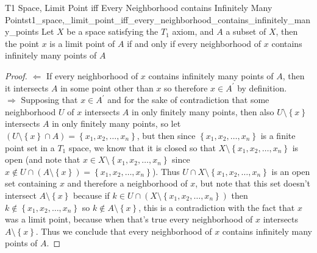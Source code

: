 \begin{proposition}{T1 Space, Limit Point iff Every Neighborhood contains
Infinitely Many
Points}{t1_space,_limit_point_iff_every_neighborhood_contains_infinitely_many_points}
Let \( X \) be a space satisfying the \( T _{ 1 }  \) axiom, and \( A \) a
subset of \( X \), then the point \( x \) is a limit point of \( A \) if and
only if every neighborhood of \( x \) contains infinitely many points of \( A \) 
\end{proposition}
\begin{proof}
    \( \Leftarrow  \) If every neighborhood of \( x \) contains infinitely many
    points of \( A \), then it intersects \( A \) in some point other than \( x
    \) so therefore \( x \in A ^{ \prime  } \) by definition.\\
    \( \Rightarrow  \) Supposing that \( x \in A ^{ \prime  }  \) and for the
    sake of contradiction that some neighborhood \( U \) of \( x \) intersects
    \( A \) in only finitely many points, then also \( U \setminus \left\{ x
    \right\}  \) intersects \( A \) in only finitely many points, so let \(
    \left( U \setminus \left\{ x \right\} \cap A \right) = \left\{ x_{1} , x_{2}
    , \dotsc , x_{n} \right\}  \), but then since  \( \left\{ x_{1} , x_{2}
    , \dotsc , x_{n} \right\} \) is a finite point set in a \( T _{ 1 }  \)
    space, we know that it is closed so that \( X \setminus \left\{ x_{1} ,
    x_{2} , \dotsc , x_{n} \right\}  \) is open (and note that \( x \in  X
    \setminus \left\{ x_{1} , x_{2} , \dotsc , x_{n} \right\}  \) since \( x
    \not\in U \cap \left( A \setminus \left\{ x \right\}  \right) = \left\{
    x_{1} , x_{2} , \dotsc , x_{n} \right\} \)). Thus \( U \cap X \setminus
    \left\{ x_{1} , x_{2} , \dotsc , x_{n} \right\}  \) is an open set
    containing \( x \) and therefore a neighborhood of \( x \), but note that
    this set doesn't intersect \( A \setminus \left\{ x \right\}  \) because if
    \( k \in U \cap \left( X \setminus \left\{ x_{1} , x_{2} , \dotsc , x_{n}
    \right\} \right)    \) then \( k \not\in \left\{ x_{1} , x_{2} , \dotsc ,
    x_{n} \right\}  \) so \( k \not\in A \setminus \left\{ x \right\}  \), this
    is a contradiction with the fact that \( x \) was a limit point, because
    when that's true every neighborhood of \( x \) intersects \( A \setminus
    \left\{ x \right\}  \). Thus we conclude that every neighborhood of \( x \)
    contains infinitely many points of \( A \).
\end{proof}

